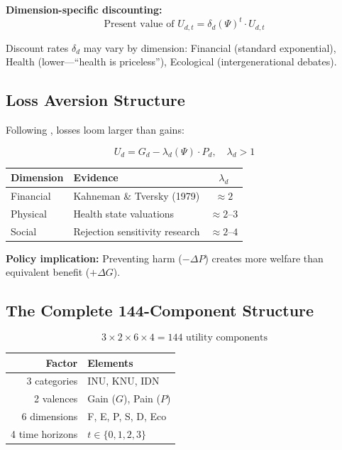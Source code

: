 \textbf{Dimension-specific discounting:}
\begin{equation}
\text{Present value of } U_{d,t} = \delta_d(\Psi)^t \cdot U_{d,t}
\label{eq:mp-discounting}
\end{equation}

Discount rates $\delta_d$ may vary by dimension: Financial (standard exponential), Health (lower---``health is priceless''), Ecological (intergenerational debates).

\subsection{Loss Aversion Structure}

Following \citet{kahnemantversky1979}, losses loom larger than gains:

\begin{equation}
\boxed{
U_d = G_d - \lambda_d(\Psi) \cdot P_d, \quad \lambda_d > 1
}
\label{eq:mp-loss-aversion}
\end{equation}

\begin{center}
\renewcommand{\arraystretch}{1.2}
\begin{tabular}{@{}llc@{}}
\toprule
\textbf{Dimension} & \textbf{Evidence} & $\lambda_d$ \\
\midrule
Financial & Kahneman \& Tversky (1979) & $\approx 2$ \\
Physical & Health state valuations & $\approx 2$--$3$ \\
Social & Rejection sensitivity research & $\approx 2$--$4$ \\
\bottomrule
\end{tabular}
\end{center}

\textbf{Policy implication:} Preventing harm ($-\Delta P$) creates more welfare than equivalent benefit ($+\Delta G$).

\subsection{The Complete 144-Component Structure}

\begin{equation}
\boxed{
3 \times 2 \times 6 \times 4 = 144 \text{ utility components}
}
\label{eq:mp-144-components}
\end{equation}

\begin{center}
\renewcommand{\arraystretch}{1.2}
\begin{tabular}{@{}rl@{}}
\toprule
\textbf{Factor} & \textbf{Elements} \\
\midrule
3 categories & INU, KNU, IDN \\
2 valences & Gain ($G$), Pain ($P$) \\
6 dimensions & F, E, P, S, D, Eco \\
4 time horizons & $t \in \{0, 1, 2, 3\}$ \\
\bottomrule
\end{tabular}
\end{center}


